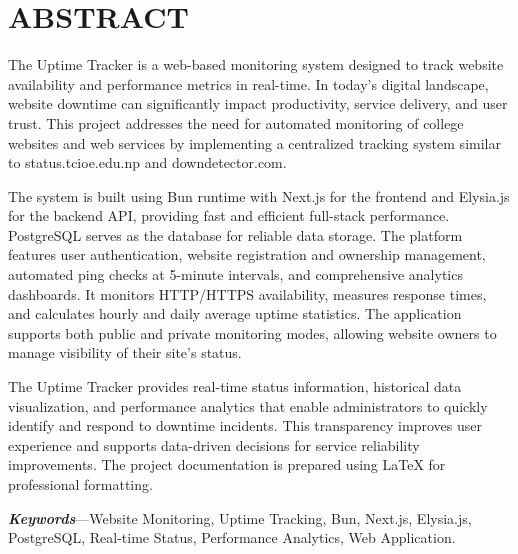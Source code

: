 

\chapter*{ABSTRACT}
{}

\noindent The Uptime Tracker is a web-based monitoring system designed to track website availability and performance metrics in real-time. In today's digital landscape, website downtime can significantly impact productivity, service delivery, and user trust. This project addresses the need for automated monitoring of college websites and web services by implementing a centralized tracking system similar to status.tcioe.edu.np and downdetector.com.

\noindent The system is built using Bun runtime with Next.js for the frontend and Elysia.js for the backend API, providing fast and efficient full-stack performance. PostgreSQL serves as the database for reliable data storage. The platform features user authentication, website registration and ownership management, automated ping checks at 5-minute intervals, and comprehensive analytics dashboards. It monitors HTTP/HTTPS availability, measures response times, and calculates hourly and daily average uptime statistics. The application supports both public and private monitoring modes, allowing website owners to manage visibility of their site's status.

\noindent The Uptime Tracker provides real-time status information, historical data visualization, and performance analytics that enable administrators to quickly identify and respond to downtime incidents. This transparency improves user experience and supports data-driven decisions for service reliability improvements. The project documentation is prepared using LaTeX for professional formatting.

\vspace{1em}
\noindent\textit{\textbf{Keywords}}---Website Monitoring, Uptime Tracking, Bun, Next.js, Elysia.js, PostgreSQL, Real-time Status, Performance Analytics, Web Application.